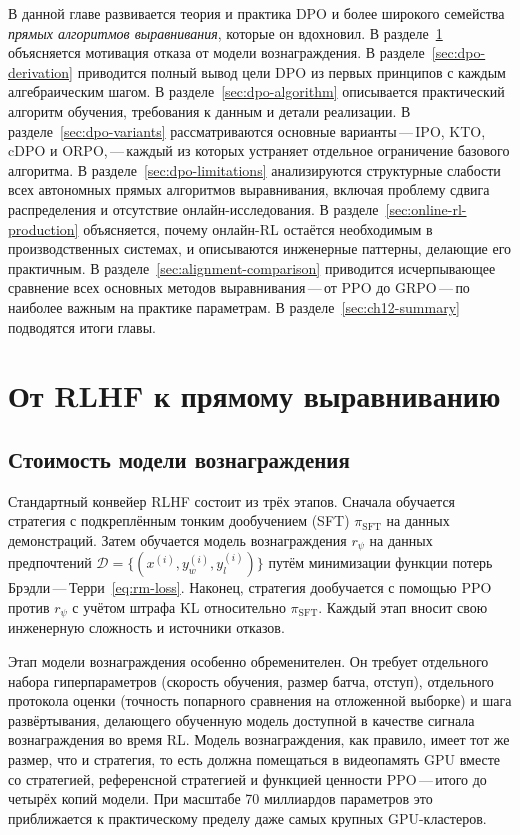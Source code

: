 В данной главе развивается теория и практика DPO и более широкого семейства \emph{прямых алгоритмов выравнивания}, которые он вдохновил. В разделе~\ref{sec:dpo-motivation} объясняется мотивация отказа от модели вознаграждения. В разделе~\ref{sec:dpo-derivation} приводится полный вывод цели DPO из первых принципов с каждым алгебраическим шагом. В разделе~\ref{sec:dpo-algorithm} описывается практический алгоритм обучения, требования к данным и детали реализации. В разделе~\ref{sec:dpo-variants} рассматриваются основные варианты\,---\,IPO, KTO, cDPO и ORPO,\,---\,каждый из которых устраняет отдельное ограничение базового алгоритма. В разделе~\ref{sec:dpo-limitations} анализируются структурные слабости всех автономных прямых алгоритмов выравнивания, включая проблему сдвига распределения и отсутствие онлайн-исследования. В разделе~\ref{sec:online-rl-production} объясняется, почему онлайн-RL остаётся необходимым в производственных системах, и описываются инженерные паттерны, делающие его практичным. В разделе~\ref{sec:alignment-comparison} приводится исчерпывающее сравнение всех основных методов выравнивания\,---\,от PPO до GRPO\,---\,по наиболее важным на практике параметрам. В разделе~\ref{sec:ch12-summary} подводятся итоги главы.

\section{От RLHF к прямому выравниванию}
\label{sec:dpo-motivation}

\subsection{Стоимость модели вознаграждения}

Стандартный конвейер RLHF состоит из трёх этапов. Сначала обучается стратегия с подкреплённым тонким дообучением (SFT) $\pi_\mathrm{SFT}$ на данных демонстраций. Затем обучается модель вознаграждения $r_\psi$ на данных предпочтений $\mathcal{D} = \{(x^{(i)}, y_w^{(i)}, y_l^{(i)})\}$ путём минимизации функции потерь Брэдли\,---\,Терри~\eqref{eq:rm-loss}. Наконец, стратегия дообучается с помощью PPO против $r_\psi$ с учётом штрафа KL относительно $\pi_\mathrm{SFT}$. Каждый этап вносит свою инженерную сложность и источники отказов.

Этап модели вознаграждения особенно обременителен. Он требует отдельного набора гиперпараметров (скорость обучения, размер батча, отступ), отдельного протокола оценки (точность попарного сравнения на отложенной выборке) и шага развёртывания, делающего обученную модель доступной в качестве сигнала вознаграждения во время RL. Модель вознаграждения, как правило, имеет тот же размер, что и стратегия, то есть должна помещаться в видеопамять GPU вместе со стратегией, референсной стратегией и функцией ценности PPO\,---\,итого до четырёх копий модели. При масштабе 70 миллиардов параметров это приближается к практическому пределу даже самых крупных GPU-кластеров.

